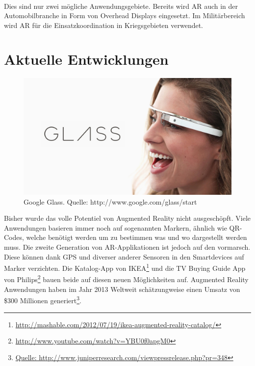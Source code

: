 \paragraph{}
Dies sind nur zwei mögliche Anwendungsgebiete. Bereits wird AR auch in der Automobilbranche in Form von Overhead Displays eingesetzt. Im Militärbereich wird AR für die Einsatzkoordination in Kriegsgebieten verwendet.

\section{Aktuelle Entwicklungen}

\begin{figure}[!ht]
\centering
\includegraphics[width=\textwidth]{images/google-glass} 
\caption{Google Glass. Quelle: http://www.google.com/glass/start}
\label{fig:google-glass}
\end{figure}
\noindent
Bisher wurde das volle Potentiel von Augmented Reality nicht ausgeschöpft. Viele Anwendungen basieren immer noch auf sogenannten Markern, ähnlich wie QR-Codes, welche benötigt werden um zu bestimmen was und wo dargestellt werden muss. Die zweite Generation von AR-Applikationen ist jedoch auf den vormarsch. Diese können dank GPS und diverser anderer Sensoren in den Smartdevices auf Marker verzichten. Die Katalog-App von IKEA\footnote{\protect\url{http://mashable.com/2012/07/19/ikea-augmented-reality-catalog/}} und die TV Buying Guide App von Philips\footnote{\protect\url{http://www.youtube.com/watch?v=YBU0f0apgM0}} bauen beide auf diesen neuen Möglichkeiten auf. Augmented Reality Anwendungen haben im Jahr 2013 Weltweit schätzungweise einen Umsatz von \$300 Millionen generiert\footnote{\protect\url{Quelle: http://www.juniperresearch.com/viewpressrelease.php?pr=348}}.

